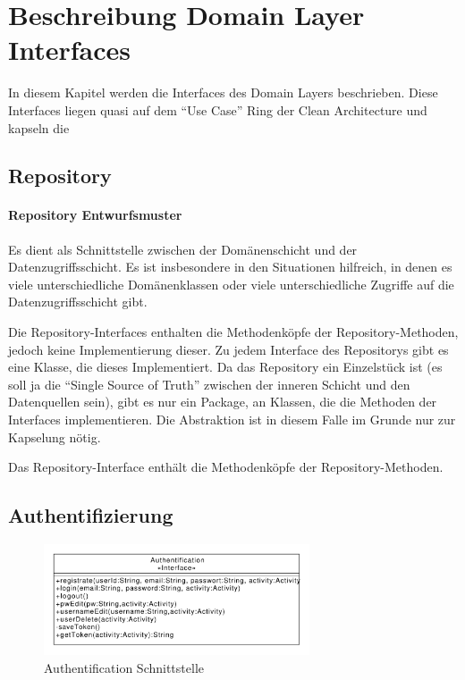 \chapter{Beschreibung Domain Layer Interfaces}

In diesem Kapitel werden die Interfaces des Domain Layers beschrieben.
Diese Interfaces liegen quasi auf dem "`Use Case"' Ring der Clean Architecture und kapseln die

\section{Repository}
\subsubsection{Repository Entwurfsmuster}
Es dient als Schnittstelle zwischen der Domänenschicht und der Datenzugriffsschicht. Es ist insbesondere in den Situationen hilfreich, in denen es viele unterschiedliche Domänenklassen oder viele unterschiedliche Zugriffe auf die Datenzugriffsschicht gibt.


Die Repository-Interfaces enthalten die Methodenköpfe der Repository-Methoden, jedoch keine Implementierung dieser.
Zu jedem Interface des Repositorys gibt es eine Klasse, die dieses Implementiert. Da das Repository ein Einzelstück ist (es soll ja die "`Single Source of Truth"' zwischen der inneren Schicht und den Datenquellen sein), gibt es nur ein Package, an Klassen, die die Methoden der Interfaces implementieren. 
Die Abstraktion ist in diesem Falle im Grunde nur zur Kapselung nötig.


Das Repository-Interface enthält die Methodenköpfe der Repository-Methoden. 
 
\section{Authentifizierung}

\begin{figure}[H]
\centering
\includegraphics[width=0.7\textwidth]{generatedpics/Authentification_Search_Shopping.pdf}%
\caption{Authentification Schnittstelle}%
\label{appcomp}%
\end{figure}


